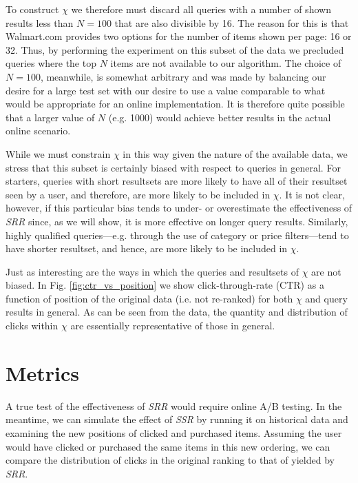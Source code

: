 \documentclass{article}
\begin{document}
To construct $\chi$ we therefore must discard all queries with a number of
shown results less than $N=100$ that are also divisible by 16. The reason for 
this is that Walmart.com provides two options for the number of items shown per
page: 16 or 32. Thus, by performing the experiment on this subset of the data we
precluded queries where the top $N$ items are not available to our algorithm.
The choice of $N=100$, meanwhile, is somewhat arbitrary and was made by
balancing our desire for a large test set with our desire to use a value
comparable to what would be appropriate for an online implementation. It is
therefore quite possible that a
larger value of $N$ (e.g. 1000) would achieve better results in the actual
online scenario.

While we must constrain $\chi$ in this way given the nature of the available 
data, we stress that this subset is certainly biased with respect to queries 
in general. For starters, queries with short resultsets are more likely to 
have all of their resultset seen by a user, and therefore, are more likely to 
be included in $\chi$. It is not clear, however, if this particular bias
tends to under- or overestimate the effectiveness of {\em SRR}
since, as we will show, it is more effective on longer query results. Similarly,
highly qualified queries---e.g. through the use of category or price
filters---tend to have shorter resultset, and hence, are more likely to be
included in $\chi$.

Just as interesting are the ways in which the queries and resultsets of $\chi$
are not biased. In Fig. \ref{fig:ctr_vs_position} we show click-through-rate (CTR)
as a function of position of the original data (i.e. not re-ranked) for both
$\chi$ and query results in general. As can be seen from the data, the quantity
and distribution of clicks within $\chi$ are essentially representative of those
in general.

\section{Metrics}

A true test of the effectiveness of {\em SRR} would require online A/B
testing. In the meantime, we can simulate the effect of {\em SSR} by running it
on historical data and examining the new positions of clicked and purchased items.
Assuming the user would have clicked or purchased the same items in this new ordering, 
we can compare the distribution of clicks in the original ranking to that of yielded 
by {\em SRR}.
\end{document}
